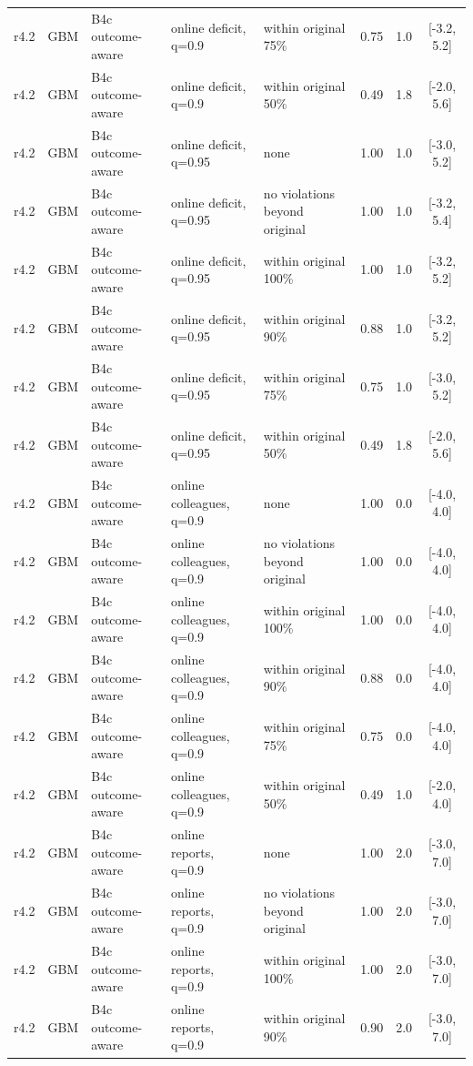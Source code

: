 \begin{longtable}{lllp{4.2cm}p{3.4cm}ccc}
r4.2 & GBM & B4c outcome-aware & online deficit, q=0.9 & within original 75\% & 0.75 & 1.0 & [-3.2, 5.2] \\
r4.2 & GBM & B4c outcome-aware & online deficit, q=0.9 & within original 50\% & 0.49 & 1.8 & [-2.0, 5.6] \\
r4.2 & GBM & B4c outcome-aware & online deficit, q=0.95 & none & 1.00 & 1.0 & [-3.0, 5.2] \\
r4.2 & GBM & B4c outcome-aware & online deficit, q=0.95 & no violations beyond original & 1.00 & 1.0 & [-3.2, 5.4] \\
r4.2 & GBM & B4c outcome-aware & online deficit, q=0.95 & within original 100\% & 1.00 & 1.0 & [-3.2, 5.2] \\
r4.2 & GBM & B4c outcome-aware & online deficit, q=0.95 & within original 90\% & 0.88 & 1.0 & [-3.2, 5.2] \\
r4.2 & GBM & B4c outcome-aware & online deficit, q=0.95 & within original 75\% & 0.75 & 1.0 & [-3.0, 5.2] \\
r4.2 & GBM & B4c outcome-aware & online deficit, q=0.95 & within original 50\% & 0.49 & 1.8 & [-2.0, 5.6] \\
r4.2 & GBM & B4c outcome-aware & online colleagues, q=0.9 & none & 1.00 & 0.0 & [-4.0, 4.0] \\
r4.2 & GBM & B4c outcome-aware & online colleagues, q=0.9 & no violations beyond original & 1.00 & 0.0 & [-4.0, 4.0] \\
r4.2 & GBM & B4c outcome-aware & online colleagues, q=0.9 & within original 100\% & 1.00 & 0.0 & [-4.0, 4.0] \\
r4.2 & GBM & B4c outcome-aware & online colleagues, q=0.9 & within original 90\% & 0.88 & 0.0 & [-4.0, 4.0] \\
r4.2 & GBM & B4c outcome-aware & online colleagues, q=0.9 & within original 75\% & 0.75 & 0.0 & [-4.0, 4.0] \\
r4.2 & GBM & B4c outcome-aware & online colleagues, q=0.9 & within original 50\% & 0.49 & 1.0 & [-2.0, 4.0] \\
r4.2 & GBM & B4c outcome-aware & online reports, q=0.9 & none & 1.00 & 2.0 & [-3.0, 7.0] \\
r4.2 & GBM & B4c outcome-aware & online reports, q=0.9 & no violations beyond original & 1.00 & 2.0 & [-3.0, 7.0] \\
r4.2 & GBM & B4c outcome-aware & online reports, q=0.9 & within original 100\% & 1.00 & 2.0 & [-3.0, 7.0] \\
r4.2 & GBM & B4c outcome-aware & online reports, q=0.9 & within original 90\% & 0.90 & 2.0 & [-3.0, 7.0] \\

\end{longtable}
